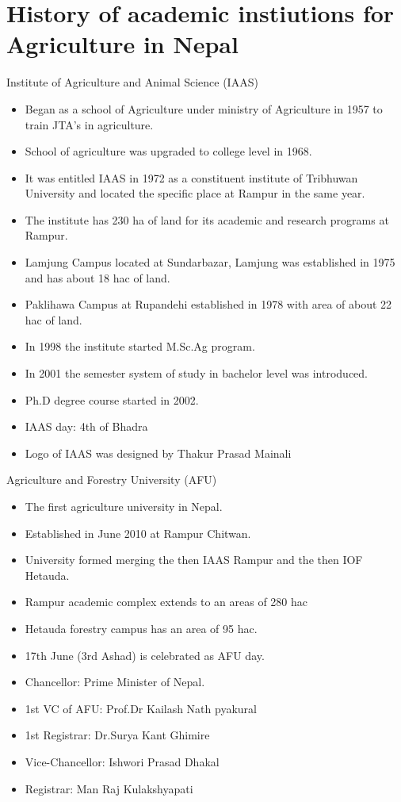 \documentclass[
  openany]{book}
\providecommand{\tightlist}{%
  \setlength{\itemsep}{0pt}\setlength{\parskip}{0pt}}
\begin{document}
\hypertarget{history-of-academic-instiutions-for-agriculture-in-nepal}{%
\section{History of academic instiutions for Agriculture in Nepal}\label{history-of-academic-instiutions-for-agriculture-in-nepal}}

Institute of Agriculture and Animal Science (IAAS)

\begin{itemize}
\tightlist
\item
  Began as a school of Agriculture under ministry of Agriculture in 1957 to train JTA's in agriculture.
\item
  School of agriculture was upgraded to college level in 1968.
\item
  It was entitled IAAS in 1972 as a constituent institute of Tribhuwan University and located the specific place at Rampur in the same year.
\item
  The institute has 230 ha of land for its academic and research programs at Rampur.
\item
  Lamjung Campus located at Sundarbazar, Lamjung was established in 1975 and has about 18 hac of land.
\item
  Paklihawa Campus at Rupandehi established in 1978 with area of about 22 hac of land.
\item
  In 1998 the institute started M.Sc.Ag program.
\item
  In 2001 the semester system of study in bachelor level was introduced.
\item
  Ph.D degree course started in 2002.
\item
  IAAS day: 4th of Bhadra
\item
  Logo of IAAS was designed by Thakur Prasad Mainali
\end{itemize}

Agriculture and Forestry University (AFU)

\begin{itemize}
\tightlist
\item
  The first agriculture university in Nepal.
\item
  Established in June 2010 at Rampur Chitwan.
\item
  University formed merging the then IAAS Rampur and the then IOF Hetauda.
\item
  Rampur academic complex extends to an areas of 280 hac
\item
  Hetauda forestry campus has an area of 95 hac.
\item
  17th June (3rd Ashad) is celebrated as AFU day.
\item
  Chancellor: Prime Minister of Nepal.
\item
  1st VC of AFU: Prof.Dr Kailash Nath pyakural
\item
  1st Registrar: Dr.Surya Kant Ghimire
\item
  Vice-Chancellor: Ishwori Prasad Dhakal
\item
  Registrar: Man Raj Kulakshyapati
\end{itemize}
\end{document}
